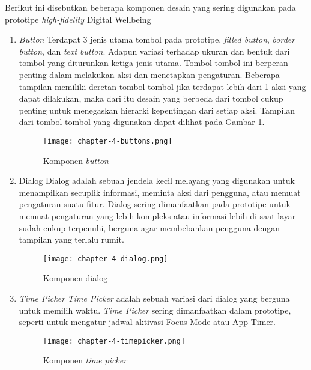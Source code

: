 Berikut ini disebutkan beberapa komponen desain yang sering digunakan pada prototipe \textit{high-fidelity} Digital Wellbeing

\begin{enumerate}
  \item \textit{Button}
  \subitem Terdapat 3 jenis utama tombol pada prototipe, \textit{filled button}, \textit{border button}, dan \textit{text button}. Adapun variasi terhadap ukuran dan bentuk dari tombol yang diturunkan ketiga jenis utama. Tombol-tombol ini berperan penting dalam melakukan aksi dan menetapkan pengaturan. Beberapa tampilan memiliki deretan tombol-tombol jika terdapat lebih dari 1 aksi yang dapat dilakukan, maka dari itu desain yang berbeda dari tombol cukup penting untuk menegaskan hierarki kepentingan dari setiap aksi. Tampilan dari tombol-tombol yang digunakan dapat dilihat pada Gambar \ref{img:button}.
    \begin{figure}[h]
      \centering
      \texttt{[image: chapter-4-buttons.png]}
      \caption{Komponen \textit{button}}
      \label{img:button}
    \end{figure}
    \FloatBarrier
  
  \item Dialog
  \subitem Dialog adalah sebuah jendela kecil melayang yang digunakan untuk menampilkan secuplik informasi, meminta aksi dari pengguna, atau memuat pengaturan suatu fitur. Dialog sering dimanfaatkan pada prototipe untuk memuat pengaturan yang lebih kompleks atau informasi lebih di saat layar sudah cukup terpenuhi, berguna agar membebankan pengguna dengan tampilan yang terlalu rumit.

  \begin{figure}[h]
    \centering
    \texttt{[image: chapter-4-dialog.png]}
    \caption{Komponen dialog}
    \label{img:dialog}
  \end{figure}
  \FloatBarrier

  \item \textit{Time Picker}
  \subitem \textit{Time Picker} adalah sebuah variasi dari dialog yang berguna untuk memilih waktu. \textit{Time Picker} sering dimanfaatkan dalam prototipe, seperti untuk mengatur jadwal aktivasi Focus Mode atau App Timer.
  
  \begin{figure}[h]
    \centering
    \texttt{[image: chapter-4-timepicker.png]}
    \caption{Komponen \textit{time picker}}
    \label{img:timepicker}
  \end{figure}
  \FloatBarrier


\end{enumerate}
